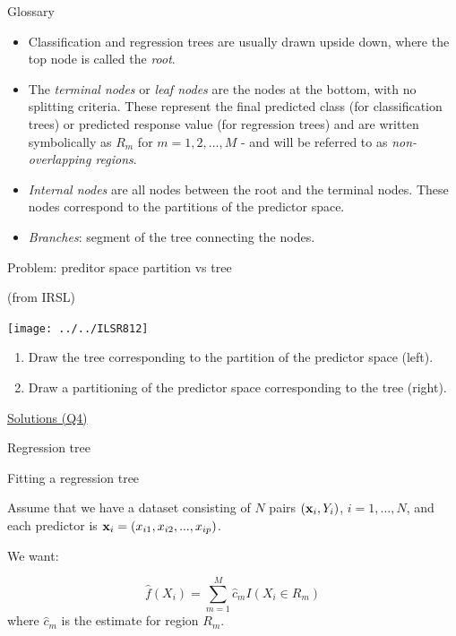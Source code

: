 \documentclass[
  ignorenonframetext,
]{beamer}
\providecommand{\tightlist}{%
  \setlength{\itemsep}{0pt}\setlength{\parskip}{0pt}}
\begin{document}
\begin{frame}

\begin{block}{Glossary}

\begin{itemize}
\tightlist
\item
  Classification and regression trees are usually drawn upside down,
  where the top node is called the \emph{root}.
\item
  The \emph{terminal nodes} or \emph{leaf nodes} are the nodes at the
  bottom, with no splitting criteria. These represent the final
  predicted class (for classification trees) or predicted response value
  (for regression trees) and are written symbolically as \(R_m\) for
  \(m = 1, 2, ..., M\) - and will be referred to as
  \emph{non-overlapping regions}.
\item
  \emph{Internal nodes} are all nodes between the root and the terminal
  nodes. These nodes correspond to the partitions of the predictor
  space.
\item
  \emph{Branches}: segment of the tree connecting the nodes.
\end{itemize}

\end{block}

\end{frame}

\begin{frame}

\begin{block}{Problem: preditor space partition vs tree}

(from IRSL)

\texttt{[image: ../../ILSR812]}

\begin{enumerate}
[1)]
\item
  Draw the tree corresponding to the partition of the predictor space
  (left).
\item
  Draw a partitioning of the predictor space corresponding to the tree
  (right).
\end{enumerate}

\href{https://rstudio-pubs-static.s3.amazonaws.com/65564_925dfde884e14ef9b5735eddd16c263e.html}{Solutions
(Q4)}

\end{block}

\end{frame}

\begin{frame}{Regression tree}
\protect\hypertarget{regression-tree}{}

\begin{block}{Fitting a regression tree}

Assume that we have a dataset consisting of \(N\) pairs
\(({\bf x}_i,Y_i)\), \(i=1,\ldots,N\), and each predictor is
\({\bf x}_i=(x_{i1},x_{i2},...,x_{ip})\).

We want:

\[\hat{f}(X_i)=\sum_{m=1}^M \hat{c}_m I(X_i \in R_m)\] where
\(\hat{c}_m\) is the estimate for region \(R_m\).

\end{block}

\end{frame}
\end{document}
